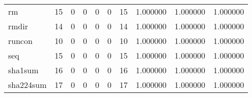 \begin{tabular}{lrrrrrrrrr}
rm        &                                      15 &                                                  0 &                                                  0 &                                                  0 &                                                  0 &                                                 15 &                                           1.000000 &                               1.000000 &                             1.000000 \\
rmdir     &                                      14 &                                                  0 &                                                  0 &                                                  0 &                                                  0 &                                                 14 &                                           1.000000 &                               1.000000 &                             1.000000 \\
runcon    &                                      10 &                                                  0 &                                                  0 &                                                  0 &                                                  0 &                                                 10 &                                           1.000000 &                               1.000000 &                             1.000000 \\
seq       &                                      15 &                                                  0 &                                                  0 &                                                  0 &                                                  0 &                                                 15 &                                           1.000000 &                               1.000000 &                             1.000000 \\
sha1sum   &                                      16 &                                                  0 &                                                  0 &                                                  0 &                                                  0 &                                                 16 &                                           1.000000 &                               1.000000 &                             1.000000 \\
sha224sum &                                      17 &                                                  0 &                                                  0 &                                                  0 &                                                  0 &                                                 17 &                                           1.000000 &                               1.000000 &                             1.000000 \\

\end{tabular}

